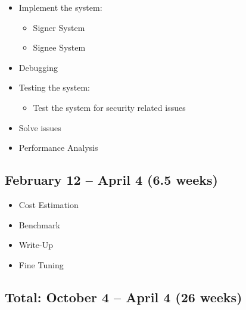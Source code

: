 \documentclass[a4paper, 11pt]{article}
\begin{document}
\begin{itemize}
    \item Implement the system: 
    \begin{itemize}
        \item Signer System
        \item Signee System
    \end{itemize}
    
    \item Debugging

    \item Testing the system: 
    \begin{itemize}
        \item Test the system for security related issues
    \end{itemize}
    \item Solve issues

    \item Performance Analysis
\end{itemize}

\subsection*{February 12 -- April 4 (6.5 weeks)}
\begin{itemize}
    \item Cost Estimation
    \item Benchmark
    \item Write-Up
    \item Fine Tuning
\end{itemize}


\subsection*{Total: October 4 -- April 4 (26 weeks)}
\end{document}
